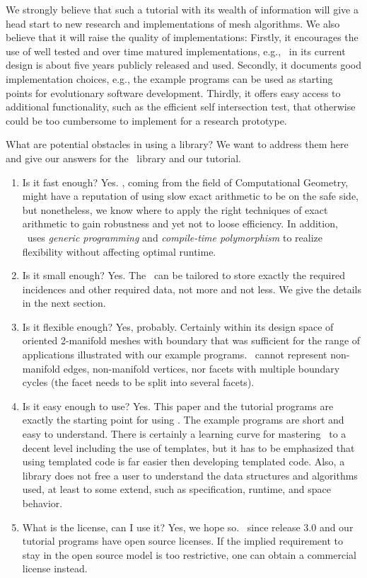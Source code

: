 We strongly believe that such a tutorial with its wealth of
information will give a head start to new research and implementations
of mesh algorithms. We also believe that it will raise the quality of
implementations: Firstly, it encourages the use of well tested and
over time matured implementations, e.g., \cgalpoly\ in its current
design is about five years publicly released and used. Secondly, it
documents good implementation choices, e.g., the example programs can
be used as starting points for evolutionary software development.
Thirdly, it offers easy access to additional functionality, such as
the efficient  self intersection test, that otherwise could be too
cumbersome to implement for a research prototype.

What are potential obstacles in using a library? We want to address
them here and give our answers for the \cgal\ library and our
tutorial. 

\begin{enumerate}
  \item
    Is it fast enough? Yes. \cgal, coming from the field of Computational
    Geometry, might have a reputation of using slow exact arithmetic
    to be on the safe side, but nonetheless, we know where to apply
    the right techniques of exact arithmetic to gain robustness and
    yet not to loose efficiency. In addition, \cgal\ uses
    \emph{generic programming\/} and \emph{compile-time
    polymorphism\/} to realize flexibility without affecting optimal
    runtime.
  \item
    Is it small enough? Yes. The \cgalpoly\ can be tailored to store
    exactly the required incidences and other required data, not more and
    not less. We give the details in the next section.
  \item
    Is it flexible enough? Yes, probably. Certainly within its design
    space of oriented 2-manifold meshes with boundary that was
    sufficient for the range of applications illustrated with our
    example programs. \cgalpoly\ cannot represent non-manifold edges,
    non-manifold vertices, nor facets with multiple boundary cycles
    (the facet needs to be split into several facets).
  \item
    Is it easy enough to use? Yes. This paper and the tutorial
    programs are exactly the starting point for using \cgalpoly. The
    example programs are short and easy to understand. There is
    certainly a learning curve for mastering \CC\ to a decent level
    including the use of templates, but it has to be emphasized that
    using templated code is far easier then developing templated code.
    Also, a library does not free a user to understand the data
    structures and algorithms used, at least to some extend, such as 
    specification, runtime, and space behavior.
  \item
    What is the license, can I use it? Yes, we hope so. \cgal\ since
    release 3.0 and our tutorial programs have open source
    licenses. If the implied requirement to stay in the open source
    model is too restrictive, one can obtain a commercial license
    instead.
\end{enumerate}

